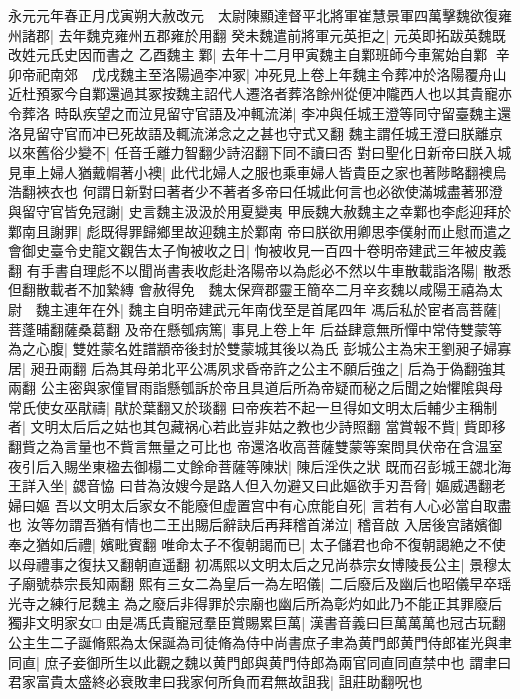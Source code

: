 永元元年春正月戊寅朔大赦改元　太尉陳顯達督平北將軍崔慧景軍四萬擊魏欲復雍州諸郡|{
	去年魏克雍州五郡雍於用翻}
癸未魏遣前將軍元英拒之|{
	元英即拓跋英魏既改姓元氏史因而書之}
乙酉魏主鄴|{
	去年十二月甲寅魏主自鄴班師今車駕始自鄴}
辛卯帝祀南郊　戊戌魏主至洛陽過李冲冢|{
	冲死見上卷上年魏主令葬冲於洛陽覆舟山近杜預冢今自鄴還過其冢按魏主詔代人遷洛者葬洛餘州從便冲隴西人也以其貴寵亦令葬洛}
時臥疾望之而泣見留守官語及冲輒流涕|{
	李冲與任城王澄等同守留臺魏主還洛見留守官而冲已死故語及輒流涕念之之甚也守式又翻}
魏主謂任城王澄曰朕離京以來舊俗少變不|{
	任音壬離力智翻少詩沼翻下同不讀曰否}
對曰聖化日新帝曰朕入城見車上婦人猶戴㡌著小襖|{
	此代北婦人之服也乘車婦人皆貴臣之家也著陟略翻襖烏浩翻裌衣也}
何謂日新對曰著者少不著者多帝曰任城此何言也必欲使滿城盡著邪澄與留守官皆免冠謝|{
	史言魏主汲汲於用夏變夷}
甲辰魏大赦魏主之幸鄴也李彪迎拜於鄴南且謝罪|{
	彪既得罪歸鄉里故迎魏主於鄴南}
帝曰朕欲用卿思李僕射而止慰而遣之會御史臺令史龍文觀告太子恂被收之日|{
	恂被收見一百四十卷明帝建武三年被皮義翻}
有手書自理彪不以聞尚書表收彪赴洛陽帝以為彪必不然以牛車散載詣洛陽|{
	散悉但翻散載者不加縶縳}
會赦得免　魏太保齊郡靈王簡卒二月辛亥魏以咸陽王禧為太尉　魏主連年在外|{
	魏主自明帝建武元年南伐至是首尾四年}
馮后私於宦者高菩薩|{
	菩蓬晡翻薩桑葛翻}
及帝在懸瓠病篤|{
	事見上卷上年}
后益肆意無所憚中常侍雙蒙等為之心腹|{
	雙姓蒙名姓譜顓帝後封於雙蒙城其後以為氏}
彭城公主為宋王劉昶子婦寡居|{
	昶丑兩翻}
后為其母弟北平公馮夙求昏帝許之公主不願后強之|{
	后為于偽翻強其兩翻}
公主密與家僮冒雨詣懸瓠訴於帝且具道后所為帝疑而秘之后聞之始懼隂與母常氏使女巫猒禱|{
	猒於葉翻又於琰翻}
曰帝疾若不起一旦得如文明太后輔少主稱制者|{
	文明太后后之姑也其包藏祸心若此豈非姑之教也少詩照翻}
當賞報不貲|{
	貲即移翻貲之為言量也不貲言無量之可比也}
帝還洛收高菩薩雙蒙等案問具伏帝在含温室夜引后入賜坐東楹去御榻二丈餘命菩薩等陳狀|{
	陳后淫佚之狀}
既而召彭城王勰北海王詳入坐|{
	勰音恊}
曰昔為汝嫂今是路人但入勿避又曰此嫗欲手刃吾脅|{
	嫗威遇翻老婦曰嫗}
吾以文明太后家女不能廢但虚置宫中有心庶能自死|{
	言若有人心必當自取盡也}
汝等勿謂吾猶有情也二王出賜后辭訣后再拜稽首涕泣|{
	稽音啟}
入居後宫諸嬪御奉之猶如后禮|{
	嬪毗賓翻}
唯命太子不復朝謁而已|{
	太子儲君也命不復朝謁絶之不使以母禮事之復扶又翻朝直遥翻}
初馮熙以文明太后之兄尚恭宗女博陵長公主|{
	景穆太子廟號恭宗長知兩翻}
熙有三女二為皇后一為左昭儀|{
	二后廢后及幽后也昭儀早卒瑶光寺之練行尼魏主為之廢后非得罪於宗廟也幽后所為彰灼如此乃不能正其罪廢后獨非文明家女□}
由是馮氏貴寵冠羣臣賞賜累巨萬|{
	漢書音義曰巨萬萬萬也冠古玩翻}
公主生二子誕脩熙為太保誕為司徒脩為侍中尚書庶子聿為黄門郎黄門侍郎崔光與聿同直|{
	庶子妾御所生以此觀之魏以黄門郎與黄門侍郎為兩官同直同直禁中也}
謂聿曰君家富貴太盛終必衰敗聿曰我家何所負而君無故詛我|{
	詛莊助翻呪也}
